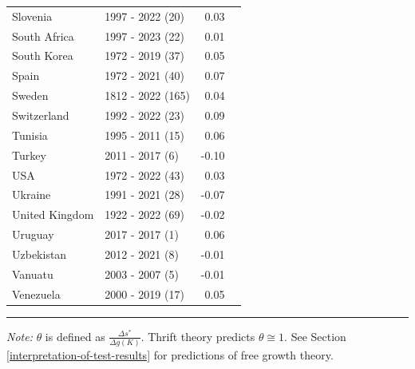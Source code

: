 \begin{table}[H]
{{\begin{tabular}{llrr}
Slovenia & 1997 - 2022 (20) & 0.03\\
South Africa & 1997 - 2023 (22) & 0.01\\
South Korea & 1972 - 2019 (37) & 0.05\\
\addlinespace
Spain & 1972 - 2021 (40) & 0.07\\
Sweden & 1812 - 2022 (165) & 0.04\\
Switzerland & 1992 - 2022 (23) & 0.09\\
Tunisia & 1995 - 2011 (15) & 0.06\\
Turkey & 2011 - 2017 (6) & -0.10\\
\addlinespace
USA & 1972 - 2022 (43) & 0.03\\
Ukraine & 1991 - 2021 (28) & -0.07\\
United Kingdom & 1922 - 2022 (69) & -0.02\\
Uruguay & 2017 - 2017 (1) & 0.06\\
Uzbekistan & 2012 - 2021 (8) & -0.01\\
\addlinespace
Vanuatu & 2003 - 2007 (5) & -0.01\\
Venezuela & 2000 - 2019 (17) & 0.05\\
\end{tabular}

}

}
\hrule
\label{tbl-indicator_table}
\begin{flushleft}
\footnotesize \emph{Note:} \(\theta\) is defined as \(\frac{\Delta s^*}{\Delta g(K)}\). Thrift theory predicts \(\theta \cong 1\). See Section \ref{interpretation-of-test-results} for predictions of free growth theory. 

\end{flushleft}
\end{table}